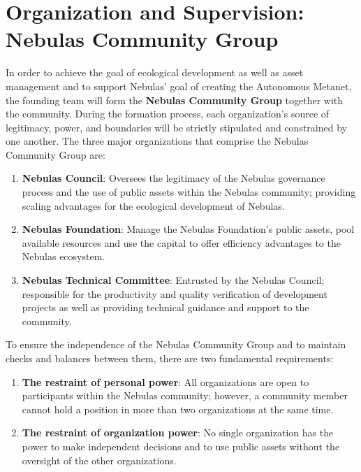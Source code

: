 \section{Organization and Supervision: Nebulas Community Group}

In order to achieve the goal of ecological development as well as asset management and to support Nebulas' goal of creating the Autonomous Metanet, the founding team will form the \textbf{Nebulas Community Group} together with the community. During the formation process, each organization's source of legitimacy, power, and boundaries will be strictly stipulated and constrained by one another. The three major organizations that comprise the Nebulas Community Group are:

\begin{enumerate}
	\item \textbf{Nebulas Council}: Oversees the legitimacy of the Nebulas governance process and the use of public assets within the Nebulas community; providing scaling advantages for the ecological development of Nebulas.
	\item \textbf{Nebulas Foundation}: Manage the Nebulas Foundation's public assets, pool available resources and use the capital to offer efficiency advantages to the Nebulas ecosystem.
	\item \textbf{Nebulas Technical Committee}: Entrusted by the Nebulas Council; responsible for the productivity and quality verification of development projects as well as providing technical guidance and support to the community.
\end{enumerate}

\vspace{2em}

To ensure the independence of the Nebulas Community Group and to maintain checks and balances between them, there are two fundamental requirements:

\begin{enumerate}
	\item \textbf{The restraint of personal power}: All organizations are open to participants within the Nebulas community; however, a community member cannot hold a position in more than two organizations at the same time.
	\item \textbf{The restraint of organization power}: No single organization has the power to make independent decisions and to use public assets without the oversight of the other organizations.
\end{enumerate}

